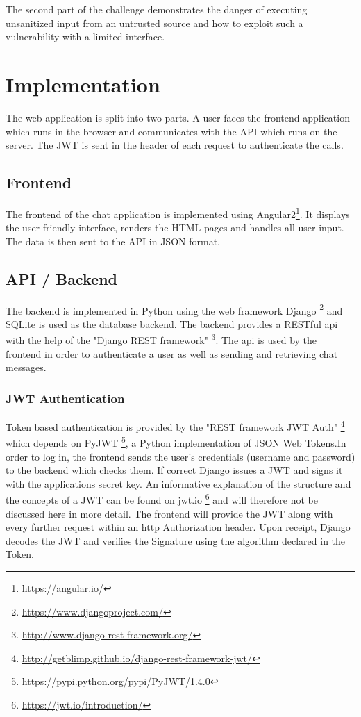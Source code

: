 \documentclass[12pt,a4paper]{article}
\begin{document}
The second part of the challenge demonstrates the danger of executing unsanitized input from an untrusted source and how to exploit such a vulnerability with a limited interface.


\section{Implementation}

The web application is split into two parts. A user faces the frontend application which runs in the browser and communicates with the API which runs on the server. The JWT is sent in the header of each request to authenticate the calls.

\subsection{Frontend}
The frontend of the chat application is implemented using Angular2\footnote{https://angular.io/}. It displays the user friendly interface, renders the HTML pages and handles all user input. The data is then sent to the API in JSON format. 
 
\subsection{API / Backend}
The backend is implemented in Python using the web framework Django \footnote{\url{https://www.djangoproject.com/}} and SQLite is used as the database backend. The backend provides a RESTful api with the help of the "Django REST framework" \footnote{\url{http://www.django-rest-framework.org/}}. The api is used by the frontend in order to authenticate a user as well as sending and retrieving chat messages. 

\subsubsection{JWT Authentication}
Token based authentication is provided by the "REST framework JWT Auth" \footnote{\url{http://getblimp.github.io/django-rest-framework-jwt/}} which depends on PyJWT \footnote{\url{https://pypi.python.org/pypi/PyJWT/1.4.0}}, a Python implementation of JSON Web Tokens.In order to log in, the frontend sends the user's credentials (username and password) to the backend which checks them. If correct Django issues a JWT and signs it with the applications secret key. An informative explanation of the structure and the concepts of a JWT can be found on jwt.io \footnote{\url{https://jwt.io/introduction/}} and will therefore not be discussed here in more detail. 
The frontend will provide the JWT along with every further request within an http Authorization header. Upon receipt, Django decodes the JWT and verifies the Signature using the algorithm declared in the Token.
\end{document}
